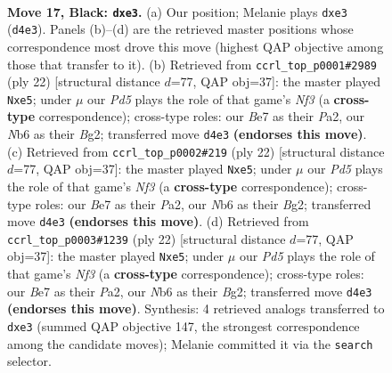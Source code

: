 \documentclass[11pt]{article}
\begin{document}
\clearpage

\begin{figure}[p]\centering
\begin{subfigure}{0.46\textwidth}\centering
\resizebox{\linewidth}{!}{%
\newchessgame
\chessboard[
  setfen={rnbr2k1/1p2bpp1/pn1qp3/7p/3p4/1Pp1N1P1/P3PPBP/RNBQRK2 b - - 1 17},
  showmover=false,
  pgfstyle=straightmove, color=movearrow, markmove={d4-e3}
]}
\caption{}
\end{subfigure}\hfill
\begin{subfigure}{0.46\textwidth}\centering
\resizebox{\linewidth}{!}{%
\newchessgame
\chessboard[
  setfen={r1bqr1k1/1pp1ppbp/1n4p1/p2Pn3/8/2N1PNPP/PP3PB1/R1BQ1RK1 w - - 1 12},
  showmover=false,
  pgfstyle=straightmove, color=movearrow, markmove={f3-e5}
]}
\caption{}
\end{subfigure}
\\[4pt]
\begin{subfigure}{0.46\textwidth}\centering
\resizebox{\linewidth}{!}{%
\newchessgame
\chessboard[
  setfen={r1bqr1k1/1pp1ppbp/1n4p1/p2Pn3/8/2N1PNPP/PP3PB1/R1BQ1RK1 w - - 1 12},
  showmover=false,
  pgfstyle=straightmove, color=movearrow, markmove={f3-e5}
]}
\caption{}
\end{subfigure}\hfill
\begin{subfigure}{0.46\textwidth}\centering
\resizebox{\linewidth}{!}{%
\newchessgame
\chessboard[
  setfen={r1bqr1k1/1pp1ppbp/1n4p1/p2Pn3/8/2N1PNPP/PP3PB1/R1BQ1RK1 w - - 1 12},
  showmover=false,
  pgfstyle=straightmove, color=movearrow, markmove={f3-e5}
]}
\caption{}
\end{subfigure}
\caption{\textbf{Move 17, Black: \texttt{dxe3}.} (a) Our position; Melanie plays \texttt{dxe3} (\texttt{d4e3}). Panels (b)--(d) are the retrieved master positions whose correspondence most drove this move (highest QAP objective among those that transfer to it). (b) Retrieved from \texttt{ccrl\_top\_p0001\#2989} (ply 22) [structural distance $d$=77, QAP obj=37]: the master played \texttt{Nxe5}; under $\mu$ our \emph{Pd5} plays the role of that game's \emph{Nf3} (a \textbf{cross-type} correspondence); cross-type roles: our \emph{B}e7 as their \emph{P}a2, our \emph{N}b6 as their \emph{B}g2; transferred move \texttt{d4e3} \textbf{(endorses this move)}. (c) Retrieved from \texttt{ccrl\_top\_p0002\#219} (ply 22) [structural distance $d$=77, QAP obj=37]: the master played \texttt{Nxe5}; under $\mu$ our \emph{Pd5} plays the role of that game's \emph{Nf3} (a \textbf{cross-type} correspondence); cross-type roles: our \emph{B}e7 as their \emph{P}a2, our \emph{N}b6 as their \emph{B}g2; transferred move \texttt{d4e3} \textbf{(endorses this move)}. (d) Retrieved from \texttt{ccrl\_top\_p0003\#1239} (ply 22) [structural distance $d$=77, QAP obj=37]: the master played \texttt{Nxe5}; under $\mu$ our \emph{Pd5} plays the role of that game's \emph{Nf3} (a \textbf{cross-type} correspondence); cross-type roles: our \emph{B}e7 as their \emph{P}a2, our \emph{N}b6 as their \emph{B}g2; transferred move \texttt{d4e3} \textbf{(endorses this move)}. Synthesis: 4 retrieved analogs transferred to \texttt{dxe3} (summed QAP objective 147, the strongest correspondence among the candidate moves); Melanie committed it via the \texttt{search} selector.}

\end{figure}
\end{document}

